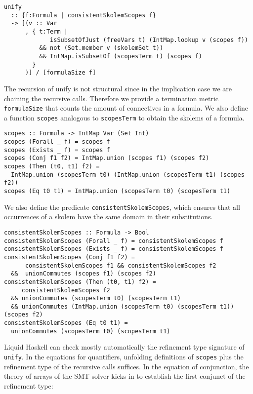 \documentclass[acmtog, anonymous]{acmart}
\newcommand{\tc}[1]{{\small\texttt{#1}}}
\begin{document}
\begin{verbatim}
unify
  :: {f:Formula | consistentSkolemScopes f}
  -> [(v :: Var
      , { t:Term |
             isSubsetOfJust (freeVars t) (IntMap.lookup v (scopes f))
          && not (Set.member v (skolemSet t))
          && IntMap.isSubsetOf (scopesTerm t) (scopes f)
        }
      )] / [formulaSize f]
\end{verbatim}

The recursion of unify is not structural since in the implication case we
are chaining the recursive calls. Therefore we provide a termination
metric \tc{formulaSize} that counts the amount of connectives in a formula.
We also define a function \tc{scopes} analogous to \tc{scopesTerm} to obtain the skolems
of a formula.

\begin{verbatim}
scopes :: Formula -> IntMap Var (Set Int)
scopes (Forall _ f) = scopes f
scopes (Exists _ f) = scopes f
scopes (Conj f1 f2) = IntMap.union (scopes f1) (scopes f2)
scopes (Then (t0, t1) f2) =
  IntMap.union (scopesTerm t0) (IntMap.union (scopesTerm t1) (scopes f2))
scopes (Eq t0 t1) = IntMap.union (scopesTerm t0) (scopesTerm t1)
\end{verbatim}

We also define the predicate \tc{consistentSkolemScopes}, which ensures that
all occurrences of a skolem have the same domain in their substitutions.

\begin{verbatim}
consistentSkolemScopes :: Formula -> Bool
consistentSkolemScopes (Forall _ f) = consistentSkolemScopes f
consistentSkolemScopes (Exists _ f) = consistentSkolemScopes f
consistentSkolemScopes (Conj f1 f2) =
      consistentSkolemScopes f1 && consistentSkolemScopes f2
  &&  unionCommutes (scopes f1) (scopes f2)
consistentSkolemScopes (Then (t0, t1) f2) =
     consistentSkolemScopes f2
  && unionCommutes (scopesTerm t0) (scopesTerm t1)
  && unionCommutes (IntMap.union (scopesTerm t0) (scopesTerm t1)) (scopes f2)
consistentSkolemScopes (Eq t0 t1) =
  unionCommutes (scopesTerm t0) (scopesTerm t1)
\end{verbatim}

Liquid Haskell can check mostly automatically the refinement type signature of
\tc{unify}. In the equations for quantifiers, unfolding definitions of
\tc{scopes} plus the refinement type of the recursive calls suffices.
In the equation of conjunction, the theory of arrays of the SMT solver
kicks in to establish the first conjunct of the refinement type:
\end{document}
